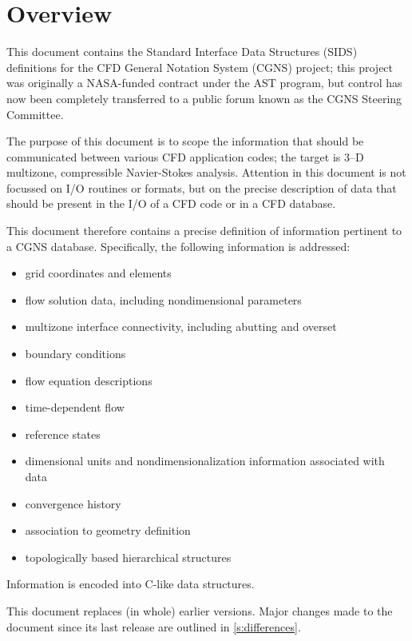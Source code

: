 \hypertarget{overview}{}
\section*{Overview}
\thispagestyle{plain}

This document contains the Standard Interface Data Structures (SIDS)
definitions for the CFD General Notation System (CGNS) project; this
project was originally a NASA-funded contract under the AST program, but
control has now been completely transferred to a public forum known as
the CGNS Steering Committee.

The purpose of this document is to scope the information that should be
communicated between various CFD application codes; the target is 3--D
multizone, compressible Navier-Stokes analysis.
Attention in this document is not focussed on I/O routines or formats,
but on the precise description of data that should be present in the I/O
of a CFD code or in a CFD database.

This document therefore contains a precise definition of information
pertinent to a CGNS database.
Specifically, the following information is addressed:
\begin{itemize}
\item grid coordinates and elements
\item flow solution data, including nondimensional parameters
\item multizone interface connectivity, including abutting and overset
\item boundary conditions
\item flow equation descriptions
\item time-dependent flow
\item reference states
\item dimensional units and nondimensionalization information associated
      with data
\item convergence history
\item association to geometry definition
\item topologically based hierarchical structures
\end{itemize}
Information is encoded into C-like data structures.

This document replaces (in whole) earlier versions. Major changes made to the
document since its last release are outlined in \autoref{s:differences}.

